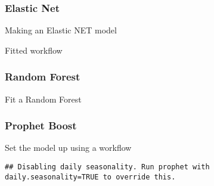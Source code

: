 \documentclass[
]{article}
\newenvironment{Shaded}{\begin{snugshade}}{\end{snugshade}}
\newcommand{\DataTypeTok}[1]{\textcolor[rgb]{0.13,0.29,0.53}{#1}}
\newcommand{\FloatTok}[1]{\textcolor[rgb]{0.00,0.00,0.81}{#1}}
\newcommand{\KeywordTok}[1]{\textcolor[rgb]{0.13,0.29,0.53}{\textbf{#1}}}
\newcommand{\NormalTok}[1]{#1}
\newcommand{\OperatorTok}[1]{\textcolor[rgb]{0.81,0.36,0.00}{\textbf{#1}}}
\newcommand{\StringTok}[1]{\textcolor[rgb]{0.31,0.60,0.02}{#1}}
\begin{document}
\hypertarget{elastic-net-1}{%
\subsubsection{Elastic Net}\label{elastic-net-1}}

Making an Elastic NET model

\begin{Shaded}
\end{Shaded}

Fitted workflow

\begin{Shaded}
\end{Shaded}

\hypertarget{random-forest-1}{%
\subsubsection{Random Forest}\label{random-forest-1}}

Fit a Random Forest

\hypertarget{prophet-boost-1}{%
\subsubsection{Prophet Boost}\label{prophet-boost-1}}

Set the model up using a workflow

\begin{verbatim}
## Disabling daily seasonality. Run prophet with daily.seasonality=TRUE to override this.
\end{verbatim}
\end{document}
